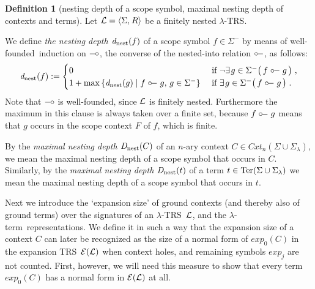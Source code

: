 \documentclass[
submission
]{dmtcs-episciences-tampered}
\newcommand{\fap}[2]{#1({#2})}
\newcommand{\indap}[2]{#1 _{#2}}
\newcommand{\subap}[2]{#1 _{#2}}
\newcommand{\supap}[2]{#1 ^{#2}}
\newcommand{\bap}{\subap}
\newcommand{\nb}{\nobreakdash}
\newcommand{\nf}{\normalfont}
\newcommand{\sdefdby}{{:=}}
\newcommand{\defdby}{\mathrel{\sdefdby}}
\newcommand{\punc}[1]{\ensuremath{\hspace*{3pt}{#1}}}
\newcommand{\tuple}[1]{\langle #1 \rangle}
\newcommand{\tuplespace}{\hspace*{0.5pt}}
\newcommand{\pair}[2]{\tuple{#1, \tuplespace #2}}
\newcommand{\descsetexpmid}{\mathrel{\vert}}
\newcommand{\descsetexp}[2]{\left\{{#1}\descsetexpmid{#2}\right\}}
\newcommand{\slognot}{\neg}
\newcommand{\lognot}[1]{\slognot{#1}}
\newcommand{\existsst}[2]{\exists{\hspace*{1pt}#1}{#2}}
\newcommand{\bter}{t}
\newcommand{\asig}{\Sigma}
\newcommand{\asigmin}{\supap{\asig}{-}}
\newcommand{\asiglambda}{\indap{\asig}{\lambda}}
\newcommand{\arules}{R}
\newcommand{\alTRS}{{\cal L}}
\newcommand{\TRS}{TRS}
\newcommand{\stermsover}{\text{\nf Ter}}
\newcommand{\termsover}{\fap{\stermsover}}
\newcommand{\scontextsover}{\textit{Cxt}}
\newcommand{\scontextsnover}{\bap{\scontextsover}}
\newcommand{\contextsnover}[1]{\fap{\scontextsnover{#1}}}
\newcommand{\afoscopesym}{f}
\newcommand{\bfoscopesym}{g}
\newcommand{\acxt}{C}
\newcommand{\afoscopecxt}{F}
\newcommand{\nary}[1]{{$#1$}\nb-ary}
\newcommand{\smyleftspoon}{\hbox{${\circ}\kern-1.3pt{\relbar}$}}
\newcommand{\smyrightspoon}{\hbox{${\relbar}\kern-1.2pt{\circ}$}}
\newcommand{\sdependson}{\smyleftspoon}
\newcommand{\dependson}{\mathrel{\sdependson}}
\newcommand{\sisnestedinto}{\smyrightspoon}
\newcommand{\snestdepth}{\textit{d}_{\text{\nf nest}}}
\newcommand{\nestdepth}{\fap{\snestdepth}}
\newcommand{\smaxnestdepth}{\textit{D}_{\text{\nf nest}}}
\newcommand{\maxnestdepth}{\fap{\smaxnestdepth}}
\newcommand{\sexpandTRS}{{\cal E}}
\newcommand{\expandTRSwrt}{\fap{\sexpandTRS}}
\newcommand{\sexpand}{\textit{exp}}
\newcommand{\sexpandi}{\indap{\sexpand}}
\newcommand{\expandi}[1]{\fap{\sexpandi{#1}}}
\newcommand{\lambdaterm}{$\lambda$\nb-term}
\newcommand{\lTRS}{$\lambda$\hspace*{-0.5pt}\nb-\hspace*{-0.5pt}\TRS}
\newcommand{\wellfounded}{well-found\-ed}
\theoremstyle{plain}
\theoremstyle{definition}
\newtheorem{definition}[theorem]{Definition}
\begin{document}
\begin{definition}[nesting depth of a scope symbol, maximal nesting depth of contexts and terms]
  Let $\alTRS = \pair{\asig}{\arules}$ be a finitely nested \lTRS.   
  
  We define \emph{the nesting depth $\nestdepth{\afoscopesym}$} of a scope symbol $\afoscopesym\in\asigmin$
  by means of \wellfounded\ induction on $\sisnestedinto$, the converse of the nested-into relation $\sdependson$, as follows:
  \begin{equation*}
    \nestdepth{\afoscopesym}
      \defdby
        \begin{cases}
          0 & \text{ if } \lognot{\existsst{\bfoscopesym\in\asigmin}{\bigl(\, \afoscopesym \dependson \bfoscopesym \,\bigr)}} \punc{,}
          \\
          1 + \max \descsetexp{ \nestdepth{\bfoscopesym} }{ \afoscopesym \dependson \bfoscopesym,\, \bfoscopesym\in\asigmin }
            & \text{ if } \existsst{\bfoscopesym\in\asigmin}{\bigl(\, \afoscopesym \dependson \bfoscopesym \,\bigr)}  \punc{.}
        \end{cases}
  \end{equation*}
  Note that $\sisnestedinto$ is well-founded, since $\alTRS$ is finitely nested. 
  Furthermore the maximum in this clause is always taken over a finite set,
  because $\afoscopesym \dependson \bfoscopesym$ 
  means that $\bfoscopesym$ occurs in the scope context $\afoscopecxt$ of $\afoscopesym$, which is finite. 
 
  By the \emph{maximal nesting depth $\maxnestdepth{\acxt}$} of an \nary{n} context $\acxt\in\contextsnover{n}{\asig\cup\asiglambda}$,  
  we mean the maximal nesting depth of a scope symbol that occurs in $\acxt$.
  Similarly, by the \emph{maximal nesting depth $\maxnestdepth{\bter}$} of a term $\bter\in\termsover{\asig\cup\asiglambda}$  
  we mean the maximal nesting depth of a scope symbol that occurs in $\bter$.
\end{definition}





Next we introduce the `expansion size' of ground contexts (and thereby also of ground terms) over the signatures of an \lTRS~$\alTRS$, and the \lambdaterm\ representations.
We define it in such a way that the expansion size of a context $\acxt$ can later be recognized as the size of a normal form of $\expandi{0}{\acxt}$
in the expansion TRS~$\expandTRSwrt{\alTRS}$ when context holes, and remaining symbols $\sexpandi{j}$ are not counted.
First, however,
we will need this measure to show that every term $\expandi{0}{\acxt}$ has a normal form in $\expandTRSwrt{\alTRS}$ at all.
\end{document}
